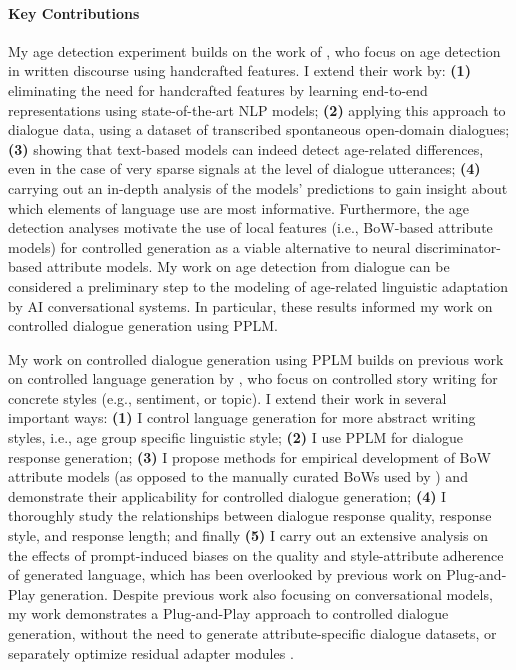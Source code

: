 \paragraph{Key Contributions}
My age detection experiment builds on the work of \cite{schler2006effects}, who focus on age detection in written discourse using handcrafted features. I extend their work by: \textbf{(1)} eliminating the need for handcrafted features by learning end-to-end representations using state-of-the-art NLP models; \textbf{(2)} applying this approach to dialogue data, using a dataset of transcribed spontaneous open-domain dialogues; \textbf{(3)} showing that text-based models can indeed detect age-related differences, even in the case of very sparse signals at the level of dialogue utterances; \textbf{(4)} carrying out an in-depth analysis of the models' predictions to gain insight about which elements of language use are most informative. Furthermore, the age detection analyses motivate the use of local features (i.e., BoW-based attribute models) for controlled generation as a viable alternative to neural discriminator-based attribute models. My work on age detection from dialogue can be considered a preliminary step to the modeling of age-related linguistic adaptation by AI conversational systems. In particular, these results informed my work on controlled dialogue generation using PPLM.

My work on controlled dialogue generation using PPLM builds on previous work on controlled language generation by \cite{dathathri2019plug}, who focus on controlled story writing for concrete styles (e.g., sentiment, or topic). I extend their work in several important ways: \textbf{(1)} I control language generation for more abstract writing styles, i.e., age group specific linguistic style; \textbf{(2)} I use PPLM for dialogue response generation; \textbf{(3)} I propose methods for empirical development of BoW attribute models (as opposed to the manually curated BoWs used by \cite{dathathri2019plug}) and demonstrate their applicability for controlled dialogue generation; \textbf{(4)} I thoroughly study the relationships between dialogue response quality, response style, and response length; 
and finally \textbf{(5)} I carry out an extensive analysis on the effects of prompt-induced biases on the quality and style-attribute adherence of generated language, which has been overlooked by previous work on Plug-and-Play generation. 
Despite previous work also focusing on 
conversational models, my work demonstrates a Plug-and-Play approach to controlled dialogue generation, without the need to generate attribute-specific dialogue datasets, or separately optimize residual adapter modules \citep{madotto-etal-2020-plug}.

